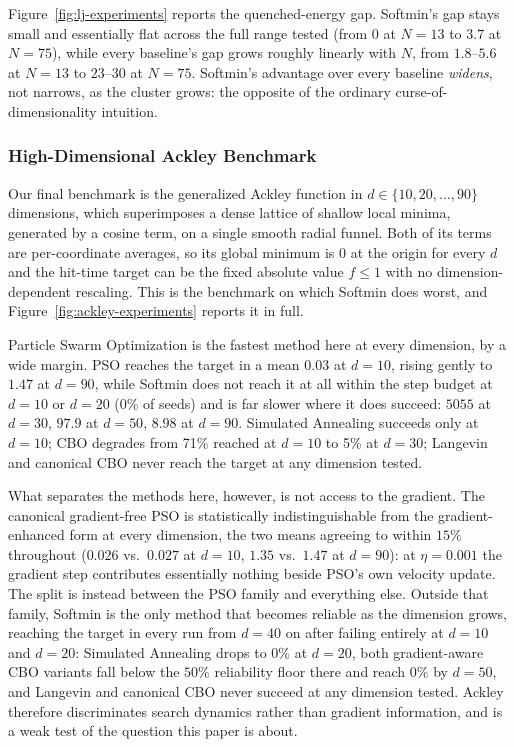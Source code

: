 \documentclass{article}
\theoremstyle{plain}
\theoremstyle{definition}
\theoremstyle{remark}
\begin{document}
Figure~\ref{fig:lj-experiments} reports the quenched-energy gap. Softmin's gap stays small and essentially flat across the full range tested (from $0$ at $N=13$ to $3.7$ at $N=75$), while every baseline's gap grows roughly linearly with $N$, from $1.8$--$5.6$ at $N=13$ to $23$--$30$ at $N=75$. Softmin's advantage over every baseline \emph{widens}, not narrows, as the cluster grows: the opposite of the ordinary curse-of-dimensionality intuition.

\subsubsection{High-Dimensional Ackley Benchmark}
\label{apx:ackley}

Our final benchmark is the generalized Ackley function in $d\in\{10,20,\dots,90\}$ dimensions, which superimposes a dense lattice of shallow local minima, generated by a cosine term, on a single smooth radial funnel. Both of its terms are per-coordinate averages, so its global minimum is $0$ at the origin for every $d$ and the hit-time target can be the fixed absolute value $f\le1$ with no dimension-dependent rescaling. This is the benchmark on which Softmin does worst, and Figure~\ref{fig:ackley-experiments} reports it in full.

Particle Swarm Optimization is the fastest method here at every dimension, by a wide margin. PSO reaches the target in a mean $0.03$ at $d=10$, rising gently to $1.47$ at $d=90$, while Softmin does not reach it at all within the step budget at $d=10$ or $d=20$ (0\% of seeds) and is far slower where it does succeed: $5055$ at $d=30$, $97.9$ at $d=50$, $8.98$ at $d=90$. Simulated Annealing succeeds only at $d=10$; CBO degrades from 71\% reached at $d=10$ to 5\% at $d=30$; Langevin and canonical CBO never reach the target at any dimension tested.

What separates the methods here, however, is not access to the gradient. The canonical gradient-free PSO is statistically indistinguishable from the gradient-enhanced form at every dimension, the two means agreeing to within $15\%$ throughout ($0.026$ vs.\ $0.027$ at $d=10$, $1.35$ vs.\ $1.47$ at $d=90$): at $\eta=0.001$ the gradient step contributes essentially nothing beside PSO's own velocity update. The split is instead between the PSO family and everything else. Outside that family, Softmin is the only method that becomes reliable as the dimension grows, reaching the target in every run from $d=40$ on after failing entirely at $d=10$ and $d=20$: Simulated Annealing drops to $0\%$ at $d=20$, both gradient-aware CBO variants fall below the $50\%$ reliability floor there and reach $0\%$ by $d=50$, and Langevin and canonical CBO never succeed at any dimension tested. Ackley therefore discriminates search dynamics rather than gradient information, and is a weak test of the question this paper is about.
\end{document}
